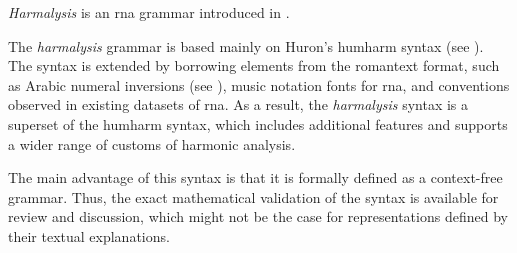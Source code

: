 

\emph{Harmalysis} is an \gls{rna} grammar introduced in
\textcite{napoleslopez2020harmalysis}.

The \emph{harmalysis} grammar is based mainly on Huron's
\gls{humharm} syntax (see ).
The syntax is extended by borrowing elements from the
\gls{romantext} format, such as Arabic numeral inversions
(see ), music notation fonts for
\gls{rna},
and conventions observed in existing datasets of \gls{rna}.
As  a result,  the \emph{harmalysis} syntax is a superset of
the \gls{humharm} syntax,  which includes additional
features and supports a wider range of customs of harmonic
analysis.

The main advantage of this syntax is that it is formally
defined as a context-free grammar. Thus, the exact
mathematical validation of the syntax is available for
review and discussion, which might not be the case for
representations defined by their textual explanations.
